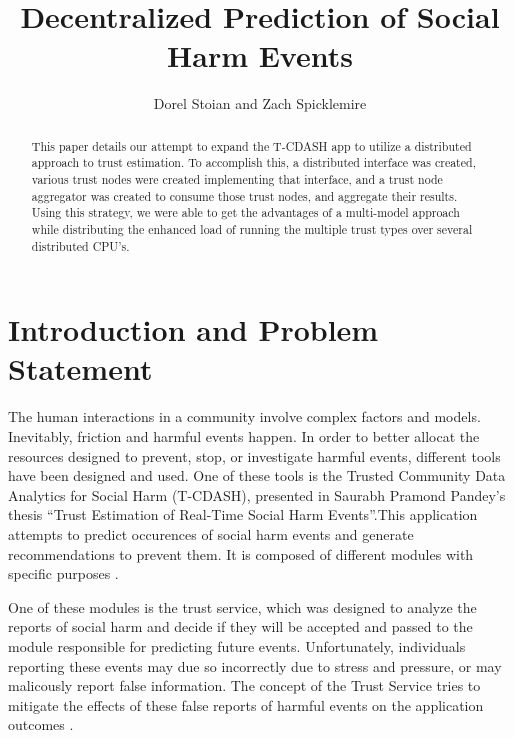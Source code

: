 \documentclass[11pt]{article}
\begin{document}
\title{Decentralized Prediction of Social Harm Events}
\author{Dorel Stoian and Zach Spicklemire}

\maketitle
\cleardoublepage

\begin{abstract}
  This paper details our attempt to expand the T-CDASH app to utilize a distributed approach to trust estimation. To accomplish this, a distributed interface was created, various trust nodes were created implementing that interface, and a trust node aggregator was created to consume those trust nodes, and aggregate their results. Using this strategy, we were able to get the advantages of a multi-model approach while distributing the enhanced load of running the multiple trust types over several distributed CPU's.
\end{abstract}

\tableofcontents

\cleardoublepage

\section{Introduction and Problem Statement}

The human interactions in a community involve complex factors and models. Inevitably, friction and harmful events happen. In order to better allocat the resources designed to prevent, stop, or investigate harmful events, different tools have been designed and used. One of these tools is the Trusted Community Data Analytics for Social Harm (T-CDASH), presented in Saurabh Pramond Pandey's thesis ``Trust Estimation of Real-Time Social Harm Events''.This application attempts to predict occurences of social harm events and generate recommendations to prevent them. It is composed of different modules with specific purposes \cite{trust}. 

One of these modules is the trust service, which was designed to analyze the reports of social harm and decide if they will be accepted and passed to the module responsible for predicting future events. Unfortunately, individuals reporting these events may due so incorrectly due to stress and pressure, or may malicously report false information. The concept of the Trust Service tries to mitigate the effects of these false reports of harmful events on the application outcomes \cite[p.~25-44]{trust}.
\end{document}
